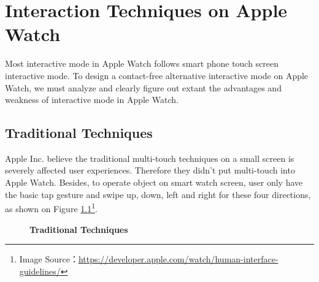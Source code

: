 \chapter{Interaction Techniques on Apple Watch}

Most interactive mode in Apple Watch follows smart phone touch screen interactive mode\cite{WatchGuidelines:2016}. To design a contact-free alternative interactive mode on Apple Watch, we must analyze and clearly figure out extant the advantages and weakness of interactive mode in Apple Watch.

\section{Traditional Techniques}

Apple Inc. believe the traditional multi-touch techniques on a small screen is severely affected user experiences. Therefore they didn't put multi-touch into Apple Watch.
Besides, to operate object on smart watch screen, user only have the basic tap gesture and swipe up, down, left and right for these four directions, as shown on Figure \ref{fig:gesture}\footnote{Image Source：\url{https://developer.apple.com/watch/human-interface-guidelines/}}.

\begin{figure}[H]
    \kaishu
    \centering
    \caption{\textbf{Traditional Techniques}}
    \label{fig:gesture}
\end{figure}

